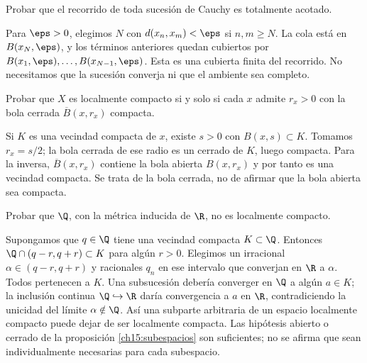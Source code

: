 \begin{ejercicio}
Probar que el recorrido de toda sucesión de Cauchy es totalmente acotado.
\end{ejercicio}
\begin{solucion}
Para $\eps>0$, elegimos $N$ con $d(x_n,x_m)<\eps$ si $n,m\ge N$. La cola está en $B(x_N,\eps)$, y los términos anteriores quedan cubiertos por $B(x_1,\eps),\ldots,B(x_{N-1},\eps)$. Esta es una cubierta finita del recorrido. No necesitamos que la sucesión converja ni que el ambiente sea completo.
\end{solucion}

\begin{ejercicio}
Probar que $X$ es localmente compacto si y solo si cada $x$ admite $r_x>0$ con la bola cerrada $\overline B(x,r_x)$ compacta.
\end{ejercicio}
\begin{solucion}
Si $K$ es una vecindad compacta de $x$, existe $s>0$ con $B(x,s)\subset K$. Tomamos $r_x=s/2$; la bola cerrada de ese radio es un cerrado de $K$, luego compacta. Para la inversa, $\overline B(x,r_x)$ contiene la bola abierta $B(x,r_x)$ y por tanto es una vecindad compacta. Se trata de la bola cerrada, no de afirmar que la bola abierta sea compacta.
\end{solucion}

\begin{ejercicio}
Probar que $\Q$, con la métrica inducida de $\R$, no es localmente compacto.
\end{ejercicio}
\begin{solucion}
Supongamos que $q\in\Q$ tiene una vecindad compacta $K\subset\Q$. Entonces $\Q\cap(q-r,q+r)\subset K$ para algún $r>0$. Elegimos un irracional $\alpha\in(q-r,q+r)$ y racionales $q_n$ en ese intervalo que converjan en $\R$ a $\alpha$. Todos pertenecen a $K$. Una subsucesión debería converger en $\Q$ a algún $a\in K$; la inclusión continua $\Q\hookrightarrow\R$ daría convergencia a $a$ en $\R$, contradiciendo la unicidad del límite $\alpha\notin\Q$. Así una subparte arbitraria de un espacio localmente compacto puede dejar de ser localmente compacta. Las hipótesis abierto o cerrado de la proposición \ref{ch15:subespacios} son suficientes; no se afirma que sean individualmente necesarias para cada subespacio.
\end{solucion}

